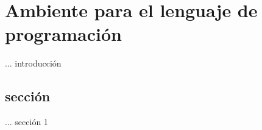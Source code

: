 \chapter{Ambiente para el lenguaje de programaci\'on}
\label{cap7.sccp}

... introducci\'on

\section{secci\'on}
\label{s1.envir}

... secci\'on 1